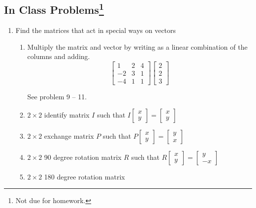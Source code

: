 \subsection*{In Class Problems\footnote{Not due for homework.}}
\begin{enumerate}
\item Find the matrices that act in special ways on vectors
	\begin{enumerate}
	
		\item Multiply the matrix and vector by writing as a linear combination of the columns and adding.
			\[ \begin{bmatrix} 1 & 2 & 4\\ -2 & 3 & 1 \\ -4 & 1 & 1 \end{bmatrix} \begin{bmatrix} 2 \\ 2  \\3 \end{bmatrix} \]
			
			See problem 9 -- 11.
			
		
		\item $2 \times 2$ identify matrix $I$ such that $I\begin{bmatrix} x \\ y \end{bmatrix} = \begin{bmatrix} x \\ y \end{bmatrix}$
		
		\item $2 \times 2$ exchange matrix $P$ such that $P\begin{bmatrix} x \\ y \end{bmatrix} = \begin{bmatrix} y \\ x \end{bmatrix}$
		
		\item $2 \times 2$ 90 degree rotation matrix $R$ such that $R\begin{bmatrix} x \\ y \end{bmatrix} = \begin{bmatrix} y \\ -x \end{bmatrix}$
		
		\item $2 \times 2$ 180 degree rotation matrix
		

\end{enumerate}
\end{enumerate}
